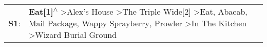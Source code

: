 \begin{supertabular}{p{0.03\textwidth}p{0.92\textwidth}}
 \textbf{S1}:  &  \textbf{Eat[1]\textsuperscript{$\wedge$}} \textgreater \enspace Alex's House\textsuperscript{} \textgreater \enspace The Triple Wide[2]\textsuperscript{} \textgreater \enspace Eat\textsuperscript{}, \enspace Abacab\textsuperscript{}, \enspace Mail Package\textsuperscript{}, \enspace Wappy Sprayberry\textsuperscript{}, \enspace Prowler\textsuperscript{} \textgreater \enspace In The Kitchen\textsuperscript{} \textgreater \enspace Wizard Burial Ground\textsuperscript{}  \enspace  \\
\end{supertabular}
